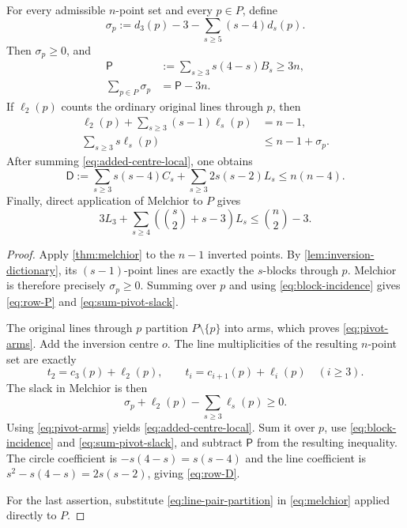 \begin{proposition}\label{prop:universal-melchior-rows}
For every admissible $n$-point set and every $p\in P$, define
\begin{equation}\label{eq:pivot-slack}
 \sigma_p:=d_3(p)-3-\sum_{s\geq5}(s-4)d_s(p).
\end{equation}
Then $\sigma_p\geq0$, and
\begin{align}
 \mathsf P
   &:=\sum_{s\geq3}s(4-s)B_s\geq3n,
      \label{eq:row-P}\\
 \sum_{p\in P}\sigma_p&=\mathsf P-3n.             \label{eq:sum-pivot-slack}
\end{align}
If $\ell_2(p)$ counts the ordinary original lines through $p$, then
\begin{align}
 \ell_2(p)+\sum_{s\geq3}(s-1)\ell_s(p)&=n-1,
      \label{eq:pivot-arms}\\
 \sum_{s\geq3}s\ell_s(p)&\leq n-1+\sigma_p.
      \label{eq:added-centre-local}
\end{align}
After summing \eqref{eq:added-centre-local}, one obtains
\begin{equation}\label{eq:row-D}
 \mathsf D
 :=\sum_{s\geq3}s(s-4)C_s
   +\sum_{s\geq3}2s(s-2)L_s
 \leq n(n-4).
\end{equation}
Finally, direct application of Melchior to $P$ gives
\begin{equation}\label{eq:global-line-row}
 3L_3+\sum_{s\geq4}
   \left(\binom{s}{2}+s-3\right)L_s
 \leq\binom n2-3.
\end{equation}
\end{proposition}

\begin{proof}
Apply \cref{thm:melchior} to the $n-1$ inverted points.  By
\cref{lem:inversion-dictionary}, its $(s-1)$-point lines are exactly the
$s$-blocks through $p$.  Melchior is therefore precisely
$\sigma_p\geq0$.  Summing over $p$ and using
\eqref{eq:block-incidence} gives \eqref{eq:row-P} and
\eqref{eq:sum-pivot-slack}.

The original lines through $p$ partition $P\setminus\{p\}$ into arms,
which proves \eqref{eq:pivot-arms}.  Add the inversion centre $o$.  The
line multiplicities of the resulting $n$-point set are exactly
\[
 t_2=c_3(p)+\ell_2(p),\qquad
 t_i=c_{i+1}(p)+\ell_i(p)\quad(i\geq3).
\]
The slack in Melchior is then
\[
 \sigma_p+\ell_2(p)-\sum_{s\geq3}\ell_s(p)\geq0.
\]
Using \eqref{eq:pivot-arms} yields
\eqref{eq:added-centre-local}.  Sum it over $p$, use
\eqref{eq:block-incidence} and \eqref{eq:sum-pivot-slack}, and subtract
$\mathsf P$ from the resulting inequality.  The circle coefficient is
$-s(4-s)=s(s-4)$ and the line coefficient is
$s^2-s(4-s)=2s(s-2)$, giving \eqref{eq:row-D}.

For the last assertion, substitute \eqref{eq:line-pair-partition} in
\eqref{eq:melchior} applied directly to $P$.
\end{proof}

